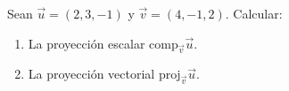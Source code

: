 Sean $\vec{u} = (2, 3, -1)$ y $\vec{v} = (4, -1, 2)$. Calcular:
\begin{enumerate}
    \item La proyección escalar $\text{comp}_{\vec{v}}\vec{u}$.
    \item La proyección vectorial $\text{proj}_{\vec{v}}\vec{u}$.
\end{enumerate}
